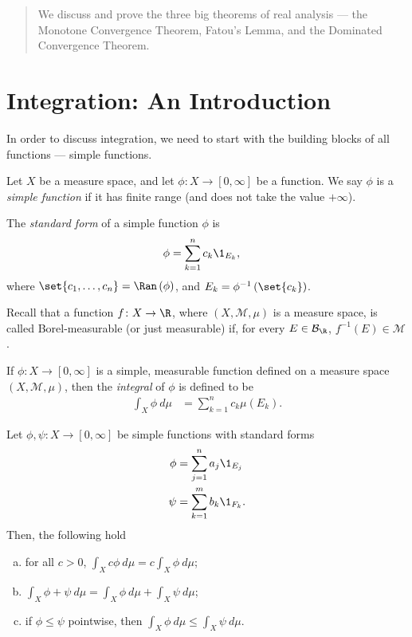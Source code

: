 \documentclass[10pt]{mypackage}
\begin{document}
\RaggedRight
\begin{abstract}
  \noindent We discuss and prove the three big theorems of real analysis --- the Monotone Convergence Theorem, Fatou's Lemma, and the Dominated Convergence Theorem.
\end{abstract}
\section{Integration: An Introduction}%
In order to discuss integration, we need to start with the building blocks of all functions --- simple functions.
\begin{definition}
  Let $X$ be a measure space, and let $\phi\colon X\rightarrow [0,\infty]$ be a function. We say $\phi$ is a \textit{simple function} if it has finite range (and does not take the value $+\infty$).\newline

  The \textit{standard form} of a simple function $\phi$ is
  \begin{align*}
    \phi &= \sum_{k=1}^{n} c_k\1_{E_k},
  \end{align*}
  where $\set{c_1,\dots,c_n} = \Ran\left( \phi \right)$, and $E_k = \phi^{-1}\left( \set{c_k} \right)$.
\end{definition}
Recall that a function $f\colon X\rightarrow \R$, where $\left( X,\mathcal{M},\mu \right)$ is a measure space, is called Borel-measurable (or just measurable) if, for every $E\in \mathcal{B}_{\R}$, $f^{-1}\left( E \right)\in \mathcal{M}$.
\begin{definition}
  If $\phi\colon X\rightarrow [0,\infty]$ is a simple, measurable function defined on a measure space $\left( X,\mathcal{M},\mu \right)$, then the \textit{integral} of $\phi$ is defined to be
  \begin{align*}
    \int_{X}^{} \phi\:d\mu &= \sum_{k=1}^{n}c_k\mu\left( E_k \right).\label{eq:integral_simple_function}\tag{$\dag$}
  \end{align*}
\end{definition}
\begin{proposition}
  Let $\phi,\psi\colon X\rightarrow [0,\infty]$ be simple functions with standard forms
  \begin{align*}
    \phi &= \sum_{j=1}^{n}a_j\1_{E_j}\\
    \psi &= \sum_{k=1}^{m} b_k\1_{F_k}.
  \end{align*}
  Then, the following hold
  \begin{enumerate}[(a)]
    \item for all $c> 0$, $\displaystyle \int_{X}^{} c\phi\:d\mu = c \int_{X}^{} \phi\:d\mu$;
    \item $\displaystyle \int_{X}^{} \phi + \psi\:d\mu = \int_{X}^{} \phi\:d\mu + \int_{X}^{} \psi\:d\mu$;
    \item if $\phi\leq \psi$ pointwise, then $\displaystyle \int_{X}^{} \phi\:d\mu \leq \int_{X}^{} \psi\:d\mu$.
  \end{enumerate}
\end{proposition}
\end{document}
